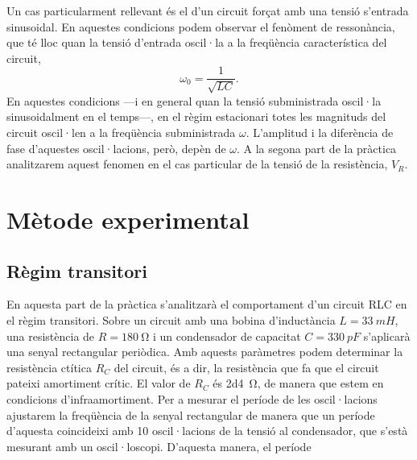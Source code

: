 Un cas particularment rellevant és el d'un circuit forçat amb una tensió s'entrada sinusoidal. En aquestes condicions podem observar el fenòment de ressonància, que té lloc quan la tensió d'entrada oscil·la a la freqüència característica del circuit, 
\begin{equation*}
	\omega_0 = \frac{1}{\sqrt{LC}}.
\end{equation*}
En aquestes condicions ---i en general quan la tensió subministrada oscil·la sinusoidalment en el temps---, en el règim estacionari totes les magnituds del circuit oscil·len a la freqüència subministrada \( \omega \). L'amplitud i la diferència de fase d'aquestes oscil·lacions, però, depèn de \( \omega \). A la segona part de la pràctica analitzarem aquest fenomen en el cas particular de la tensió de la resistència, \( V_R \).   

\section{Mètode experimental}
\subsection{Règim transitori}
En aquesta part de la pràctica s'analitzarà el comportament d'un circuit RLC en el règim transitori. Sobre un circuit amb una bobina d'inductància \( L = \SI{33}{mH} \), una resistència de \( R = \SI{180}{\ohm} \) i un condensador de capacitat \( C  = \SI{330}{pF} \) s'aplicarà una senyal rectangular periòdica. Amb aquests paràmetres podem determinar la resistència ctítica \( R_C \) del circuit, és a dir, la resistència que fa que el circuit pateixi amortiment crític. El valor de \( R_C \) és \SI{2d4}{\ohm}, de manera que estem en condicions d'infraamortiment. Per a mesurar el període de les oscil·lacions ajustarem la freqüència de la senyal rectangular de manera que un període d'aquesta coincideixi amb 10 oscil·lacions de la tensió al condensador, que s'està mesurant amb un oscil·loscopi. D'aquesta manera, el període


